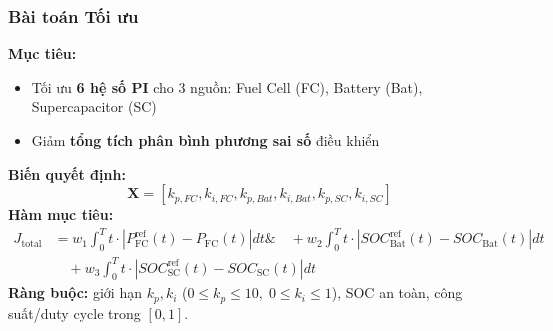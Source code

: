 \begin{frame}
    \frametitle{Bài toán Tối ưu}

    \textbf{Mục tiêu:} 
    \begin{itemize}
        \item Tối ưu \textbf{6 hệ số PI} cho 3 nguồn: Fuel Cell (FC), Battery (Bat), Supercapacitor (SC)
        \item Giảm \textbf{tổng tích phân bình phương sai số} điều khiển
    \end{itemize}

    \vspace{0.5em}
    \textbf{Biến quyết định:}
    \[
    \mathbf{X} = [k_{p,FC}, k_{i,FC}, k_{p,Bat}, k_{i,Bat}, k_{p,SC}, k_{i,SC}]
    \]
    \textbf{Hàm mục tiêu:}
    \begin{align}
    J_{\text{total}} 
    &= w_1 \int_{0}^{T} t \cdot \left| P_{\text{FC}}^{\text{ref}}(t) - P_{\text{FC}}(t) \right| dt \nonumber \&\quad + w_2 \int_{0}^{T} t \cdot \left| SOC_{\text{Bat}}^{\text{ref}}(t) - SOC_{\text{Bat}}(t) \right| dt \nonumber \\
    &\quad + w_3 \int_{0}^{T} t \cdot \left| SOC_{\text{SC}}^{\text{ref}}(t) - SOC_{\text{SC}}(t) \right| dt
    \end{align}
    \textbf{Ràng buộc:} giới hạn $k_p,k_i$ ($0 \le k_p \le 10,\; 0 \le k_i \le 1$), SOC an toàn, công suất/duty cycle trong \([0,1]\).
    
\end{frame}



